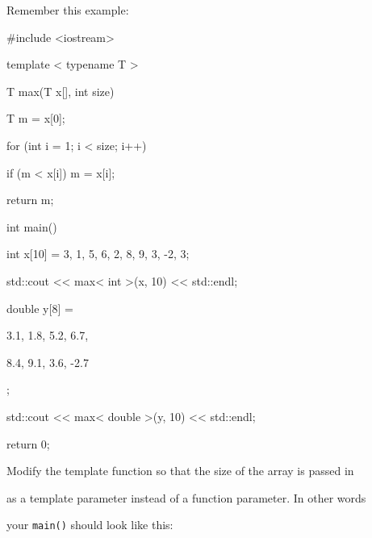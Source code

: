 Remember this example:



\begin{consolethree}[escapeinside=||]

#include <iostream>



template < typename T >

T max(T x[], int size)

{

    T m = x[0];

    for (int i = 1; i < size; i++)

    {

        if (m < x[i]) m = x[i];

    }

    return m;

}



int main()

{

    int x[10] = {3, 1, 5, 6, 2, 8, 9, 3, -2, 3};

    std::cout << max< int >(x, 10) << std::endl;



    double y[8] = {3.1, 1.8, 5.2, 6.7,

                   8.4, 9.1, 3.6, -2.7};

    std::cout << max< double >(y, 10) << std::endl;

    return 0;

}

\end{consolethree}



Modify the template function so that the size of the array is passed in

as a template parameter instead of a function parameter. In other words

your \texttt{main()} should look like this:



